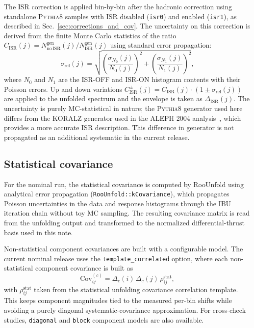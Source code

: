 The ISR correction is applied bin-by-bin after the hadronic correction using
standalone \textsc{Pythia8} samples with ISR disabled (\texttt{isr0}) and enabled
(\texttt{isr1}), as described in Sec.~\ref{sec:corrections_and_cov}. The uncertainty on
this correction is derived from the finite Monte Carlo statistics of the ratio
$C_{\mathrm{ISR}}(j) = N^{\mathrm{gen}}_{\mathrm{no\,ISR}}(j)/N^{\mathrm{gen}}_{\mathrm{ISR}}(j)$
using standard error propagation:
\begin{equation}
\sigma_{\mathrm{rel}}(j) = \sqrt{\left(\frac{\sigma_{N_0}(j)}{N_0(j)}\right)^2
+ \left(\frac{\sigma_{N_1}(j)}{N_1(j)}\right)^2},
\end{equation}
where $N_0$ and $N_1$ are the ISR-OFF and ISR-ON histogram contents with their
Poisson errors. Up and down variations
$C_{\mathrm{ISR}}^{\pm}(j) = C_{\mathrm{ISR}}(j)\cdot(1\pm\sigma_{\mathrm{rel}}(j))$
are applied to the unfolded spectrum and the envelope is taken as $\Delta_{\mathrm{ISR}}(j)$.
The uncertainty is purely MC-statistical in nature; the \textsc{Pythia8} generator
used here differs from the \textsc{KORALZ} generator used in the ALEPH 2004
analysis~\cite{Heister:2003aj}, which provides a more accurate ISR description.
This difference in generator is not propagated as an additional systematic in the
current release.

\subsection{Statistical covariance}
\label{sec:stat_covariance}

For the nominal run, the statistical covariance is computed by RooUnfold using
analytical error propagation (\texttt{RooUnfold::kCovariance}), which propagates
Poisson uncertainties in the data and response histograms through the IBU iteration
chain without toy MC sampling. The resulting covariance matrix is read from the
unfolding output and transformed to the normalized differential-thrust basis used
in this note.

Non-statistical component covariances are built with a configurable model. The
current nominal release uses the \texttt{template\_correlated} option, where each
non-statistical component covariance is built as
\begin{equation}
\mathrm{Cov}^{(c)}_{ij}=\Delta_c(i)\,\Delta_c(j)\,\rho^{\mathrm{stat}}_{ij},
\end{equation}
with $\rho^{\mathrm{stat}}_{ij}$ taken from the statistical unfolding covariance
correlation template. This keeps component magnitudes tied to the measured per-bin
shifts while avoiding a purely diagonal systematic-covariance approximation.
For cross-check studies, \texttt{diagonal} and \texttt{block} component models
are also available.

